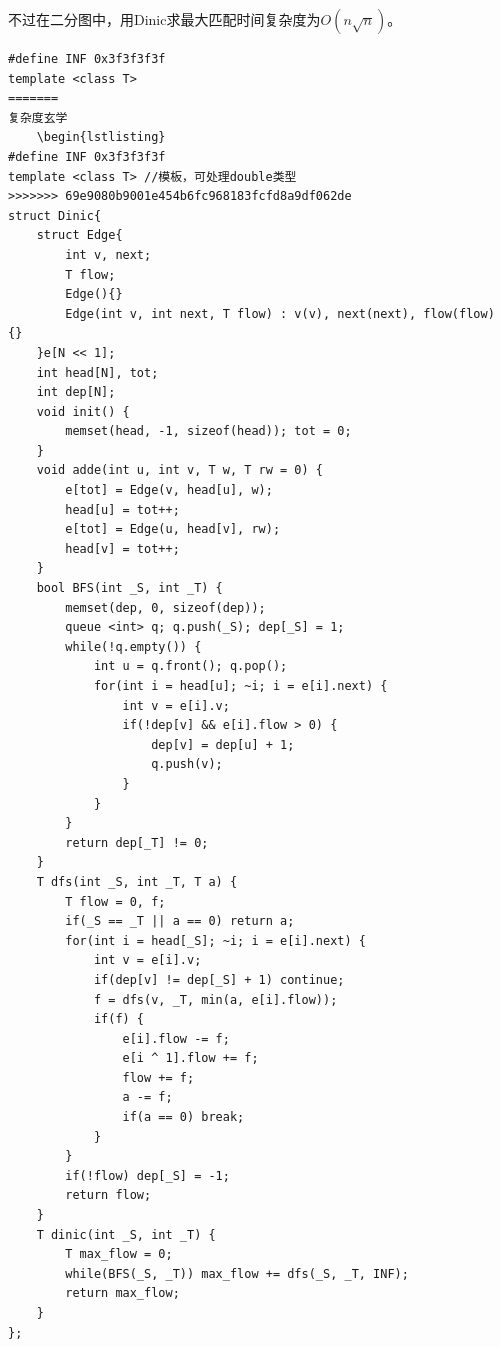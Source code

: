 \documentclass[a4paper,11pt,twoside,fontset = fandol,UTF8]{ctexbook} %
\begin{document}
不过在二分图中，用Dinic求最大匹配时间复杂度为$O(n\sqrt{n})$。
    \begin{lstlisting}
#define INF 0x3f3f3f3f
template <class T>
=======
复杂度玄学
	\begin{lstlisting}
#define INF 0x3f3f3f3f
template <class T> //模板，可处理double类型
>>>>>>> 69e9080b9001e454b6fc968183fcfd8a9df062de
struct Dinic{
    struct Edge{
        int v, next;
        T flow;
        Edge(){}
        Edge(int v, int next, T flow) : v(v), next(next), flow(flow) {}
    }e[N << 1];
    int head[N], tot;
    int dep[N];
    void init() {
        memset(head, -1, sizeof(head)); tot = 0;
    }
    void adde(int u, int v, T w, T rw = 0) {
        e[tot] = Edge(v, head[u], w);
        head[u] = tot++;
        e[tot] = Edge(u, head[v], rw);
        head[v] = tot++;
    }
    bool BFS(int _S, int _T) {
        memset(dep, 0, sizeof(dep));
        queue <int> q; q.push(_S); dep[_S] = 1;
        while(!q.empty()) {
            int u = q.front(); q.pop();
            for(int i = head[u]; ~i; i = e[i].next) {
                int v = e[i].v;
                if(!dep[v] && e[i].flow > 0) {
                    dep[v] = dep[u] + 1;
                    q.push(v);
                }
            }
        }
        return dep[_T] != 0;
    }
    T dfs(int _S, int _T, T a) {
        T flow = 0, f;
        if(_S == _T || a == 0) return a;
        for(int i = head[_S]; ~i; i = e[i].next) {
            int v = e[i].v;
            if(dep[v] != dep[_S] + 1) continue;
            f = dfs(v, _T, min(a, e[i].flow));
            if(f) {
                e[i].flow -= f;
                e[i ^ 1].flow += f;
                flow += f;
                a -= f;
                if(a == 0) break;
            }
        }
        if(!flow) dep[_S] = -1;
        return flow;
    }
    T dinic(int _S, int _T) {
        T max_flow = 0;
        while(BFS(_S, _T)) max_flow += dfs(_S, _T, INF);
        return max_flow;
    }
};
	\end{lstlisting}
\end{document}
